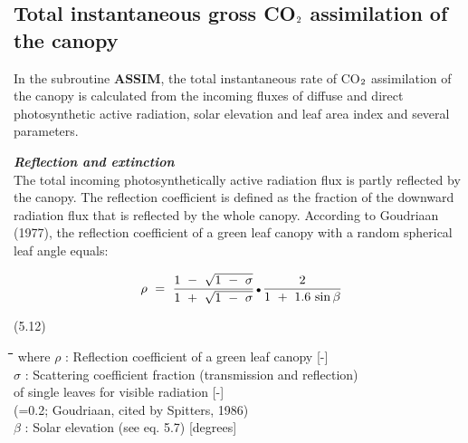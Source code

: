 \subsection{Total instantaneous gross CO$_{{\rm 2}}$ assimilation of the canopy  }  

In the subroutine {\bf ASSIM}, the total instantaneous rate of CO$_{{\rm 2}}$ assimilation of the canopy is
calculated from the incoming fluxes of diffuse and direct photosynthetic active radiation,
solar elevation and leaf area index and several parameters.



{\bf {\it Reflection and extinction\/}}\\
The total incoming photosynthetically active radiation flux is partly reflected by the
canopy. The reflection coefficient is defined as the fraction of the downward radiation
flux that is reflected by the whole canopy. According to Goudriaan (1977), the reflection
coefficient of a green leaf canopy with a random spherical leaf angle equals:

\begin{displaymath}
\rho ~=~{\frac{1~-~ \sqrt{1~-~ \sigma } }{1~+~ \sqrt{1~-~ \sigma } }} \, {\rm \Bullet{0.75ex}}\,{\frac{2}{1~+~ 1.6\, \sin \beta }}
\end{displaymath}

 
\strut\hfill (5.12)

\nwln
\begin{tabbing}
\hspace{1.27cm}\=\hspace{1.27cm}\=\hspace{1.27cm}\=\hspace{1.27cm}\=%
\hspace{1.27cm}\=\hspace{1.27cm}\=\hspace{1.27cm}\=\hspace{1.27cm}\=%
\hspace{1.27cm}\=\hspace{1.27cm}\=\kill
where $\rho$ : Reflection coefficient of a green leaf canopy        [-]\\
$\sigma$ : Scattering coefficient fraction (trans\-mission and reflection) \\
   of single leaves for visible radiation         [-]\\
   {\small (=0.2; Goudriaan, cited by Spitters, 1986)}\\
$\beta$ : Solar elevation (see eq. 5.7)        [degrees]
\end{tabbing}

